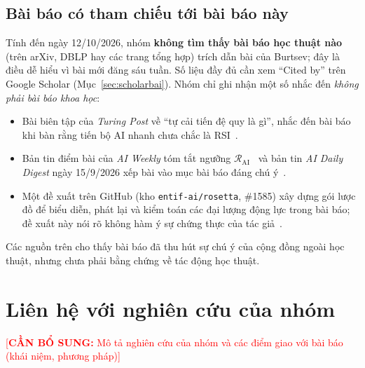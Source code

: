 \documentclass[12pt,a4paper,openany]{report}
\numberwithin{equation}{chapter}   %
\theoremstyle{definition}
\newif\ifdraft \drafttrue          %
\newcommand{\todo}[1]{\ifdraft\textcolor{red}{[\textbf{CẦN BỔ SUNG:} #1]}\fi}
\newcommand{\RAI}{\mathcal{R}_{\mathrm{AI}}}
\newcommand{\en}[1]{\textit{#1}}   %
\begin{document}
\section{Bài báo có tham chiếu tới bài báo này}\label{sec:citing}
Tính đến ngày 12/10/2026, nhóm \textbf{không tìm thấy bài báo học thuật nào} (trên arXiv, DBLP hay các trang tổng hợp) trích dẫn bài của Burtsev; đây là điều dễ hiểu vì bài mới đăng sáu tuần. Số liệu đầy đủ cần xem ``Cited by'' trên Google Scholar (Mục~\ref{sec:scholarbai}). Nhóm chỉ ghi nhận một số nhắc đến \emph{không phải bài báo khoa học}:
\begin{itemize}
  \item Bài biên tập của \en{Turing Post} về ``tự cải tiến đệ quy là gì'', nhắc đến bài báo khi bàn rằng tiến bộ AI nhanh chưa chắc là RSI~\cite{turingpost}.
  \item Bản tin điểm bài của \en{AI Weekly} tóm tắt ngưỡng $\RAI$~\cite{aiweekly} và bản tin \en{AI Daily Digest} ngày 15/9/2026 xếp bài vào mục bài báo đáng chú ý~\cite{digest}.
  \item Một đề xuất trên GitHub (kho \texttt{entif-ai/rosetta}, \#1585) xây dựng gói lược đồ để biểu diễn, phát lại và kiểm toán các đại lượng động lực trong bài báo; đề xuất này nói rõ không hàm ý sự chứng thực của tác giả~\cite{entif}.
\end{itemize}
Các nguồn trên cho thấy bài báo đã thu hút sự chú ý của cộng đồng ngoài học thuật, nhưng chưa phải bằng chứng về tác động học thuật.

\chapter{Liên hệ với nghiên cứu của nhóm}\label{ch:lienhe}
\todo{Mô tả nghiên cứu của nhóm và các điểm giao với bài báo (khái niệm, phương pháp)}

\end{document}
